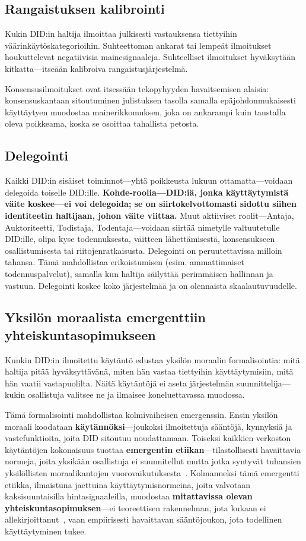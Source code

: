\documentclass[11pt,a4paper,twocolumn]{article}
\begin{document}
\subsection{Rangaistuksen kalibrointi}

Kukin DID:in haltija ilmoittaa julkisesti vastauksensa tiettyihin väärinkäytöskategorioihin. Suhteettoman ankarat tai lempeät ilmoitukset houkuttelevat negatiivisia mainesignaaleja. Suhteelliset ilmoitukset hyväksytään kitkatta---itseään kalibroiva rangaistusjärjestelmä.

Konsensusilmoitukset ovat itsessään tekopyhyyden havaitsemisen alaisia: konsensuskantaan sitoutuminen julistuksen tasolla samalla epäjohdonmukaisesti käyttäytyen muodostaa mainerikkomuksen, joka on ankarampi kuin taustalla oleva poikkeama, koska se osoittaa tahallista petosta.

\subsection{Delegointi}

Kaikki DID:in sisäiset toiminnot---yhtä poikkeusta lukuun ottamatta---voidaan delegoida toiselle DID:ille. \textbf{Kohde-roolia---DID:iä, jonka käyttäytymistä väite koskee---ei voi delegoida; se on siirtokelvottomasti sidottu siihen identiteetin haltijaan, johon väite viittaa.} Muut aktiiviset roolit---Antaja, Auktoriteetti, Todistaja, Todentaja---voidaan siirtää nimetylle valtuutetulle DID:ille, olipa kyse todennuksesta, väitteen lähettämisestä, konsensukseen osallistumisesta tai riitojenratkaisusta. Delegointi on peruutettavissa milloin tahansa. Tämä mahdollistaa erikoistumisen (esim. ammattimaiset todennuspalvelut), samalla kun haltija säilyttää perimmäisen hallinnan ja vastuun. Delegointi koskee koko järjestelmää ja on olennaista skaalautuvuudelle.

\subsection{Yksilön moraalista emergenttiin yhteiskuntasopimukseen}

Kunkin DID:in ilmoitettu käytäntö edustaa yksilön moraalin formalisointia: mitä haltija pitää hyväksyttävänä, miten hän vastaa tiettyihin käyttäytymisiin, mitä hän vaatii vastapuolilta. Näitä käytäntöjä ei aseta järjestelmän suunnittelija---kukin osallistuja valitsee ne ja ilmaisee koneluettavassa muodossa.

Tämä formalisointi mahdollistaa kolmivaiheisen emergenssin. Ensin yksilön moraali koodataan \textbf{käytännöksi}---joukoksi ilmoitettuja sääntöjä, kynnyksiä ja vastefunktioita, joita DID sitoutuu noudattamaan. Toiseksi kaikkien verkoston käytäntöjen kokonaisuus tuottaa \textbf{emergentin etiikan}---tilastollisesti havaittavia normeja, joita yksikään osallistuja ei suunnitellut mutta jotka syntyvät tuhansien yksilöllisten moraalikantojen vuorovaikutuksesta~\cite{durkheim1893}. Kolmanneksi tämä emergentti etiikka, ilmaistuna jaettuina käyttäytymisnormeina, joita valvotaan kaksisuuntaisilla hintasignaaleilla, muodostaa \textbf{mitattavissa olevan yhteiskuntasopimuksen}---ei teoreettisen rakennelman, jota kukaan ei allekirjoittanut~\cite{rawls1971}, vaan empiirisesti havaittavan sääntöjoukon, jota todellinen käyttäytyminen tukee.
\end{document}
